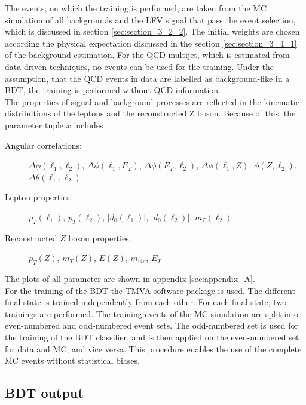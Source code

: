The events, on which the training is performed, are taken from the \gls{MC} simulation of all backgrounds and the \gls{LFV} signal that pass the event selection, which is discussed in section \ref{sec:section_3_2_2}. The initial weights are chosen according the physical expectation discussed in the section \ref{sec:section_3_4_1} of the background estimation. For the \gls{QCD} multijet, which is estimated from data driven techniques, no events can be used for the training. Under the assumption, that the \gls{QCD} events in data are labelled as background-like in a \gls{BDT},  the training is performed without \gls{QCD} information. \\

The properties of signal and background processes are reflected in the kinematic distributions of the leptons and the reconstructed Z boson. Because of this, the parameter tuple $x$ includes

\begin{description}
	\item [Angular correlations:] $\Delta \phi(\ell_1, \ell_2)$, $\Delta \phi(\ell_1, {E}_{T})$, $\Delta \phi({E}_{T}, \ell_2)$, $\Delta \phi(\ell_1, Z)$, $\phi(Z, \ell_2)$, $\Delta \theta(\ell_1, \ell_2)$
	\item [Lepton properties:] $p_T(\ell_1)$,  $p_T(\ell_2)$, $|d_0(\ell_1)|$, $|d_0(\ell_2)|$, $m_T(\ell_2)$
	\item [Reconstructed $Z$ boson properties:] $p_T(Z)$, $m_T(Z)$, $E(Z)$, $m_{vis}$, ${E}_{T}$
\end{description}

The plots of all parameter are shown in appendix \ref{sec:appendix_A}. \\

For the training of the \gls{BDT} the TMVA software package \cite{TMVA} is used. The different final state is trained independently from each other. For each final state, two trainings are performed. The training events of the \gls{MC} simulation are split into even-numbered and odd-numbered event sets. The odd-numbered set is used for the training of the \gls{BDT} classifier, and is then applied on the even-numbered set for data and \gls{MC}, and vice versa. This procedure enables the use of the complete \gls{MC} events without statistical biases. 

\subsection{BDT output}
\label{sec:section_3_5_3}

